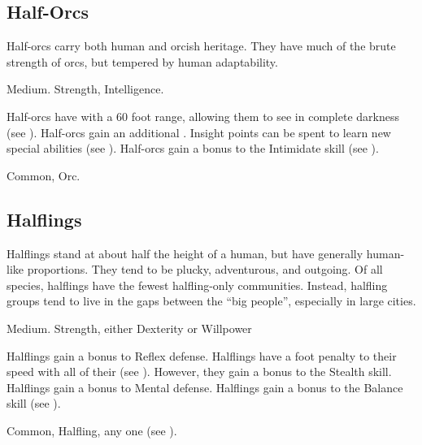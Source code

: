     \subsection{Half-Orcs}

        Half-orcs carry both human and orcish heritage.
        They have much of the brute strength of orcs, but tempered by human adaptability.

         Medium.
          Strength,  Intelligence.
        \begin{raggeditemize}
             Half-orcs have  with a 60 foot range, allowing them to see in complete darkness (see ).
             Half-orcs gain an additional .
                Insight points can be spent to learn new special abilities (see ).
             Half-orcs gain a  bonus to the Intimidate skill (see ).
        \end{raggeditemize}
         Common, Orc.

    \subsection{Halflings}

        Halflings stand at about half the height of a human, but have generally human-like proportions.
        They tend to be plucky, adventurous, and outgoing.
        Of all species, halflings have the fewest halfling-only communities.
        Instead, halfling groups tend to live in the gaps between the ``big people'', especially in large cities.

         Medium.
          Strength, either  Dexterity or  Willpower
        \begin{raggeditemize}
             Halflings gain a  bonus to Reflex defense.
             Halflings have a  foot penalty to their speed with all of their  (see ).
                However, they gain a  bonus to the Stealth skill.
             Halflings gain a  bonus to Mental defense.
             Halflings gain a  bonus to the Balance skill (see ).
        \end{raggeditemize}
         Common, Halfling, any one  (see ).


